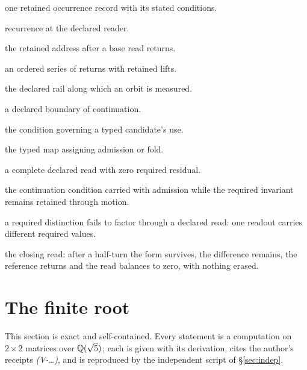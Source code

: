 \documentclass[11pt,a4paper]{article}
\theoremstyle{plain}
\theoremstyle{definition}
\theoremstyle{remark}
\begin{document}
\begin{description}[leftmargin=0pt,labelindent=0pt,itemsep=1pt,font=\normalfont\bfseries]
\item[Receipt] one retained occurrence record with its stated conditions.
\item[Return] recurrence at the declared reader.
\item[Lift] the retained address after a base read returns.
\item[Orbit] an ordered series of returns with retained lifts.
\item[Worldline] the declared rail along which an orbit is measured.
\item[Horizon] a declared boundary of continuation.
\item[Constraint] the condition governing a typed candidate's use.
\item[Gate] the typed map assigning admission or fold.
\item[Silence] a complete declared read with zero required residual.
\item[Survival] the continuation condition carried with admission while the required invariant remains retained through motion.
\item[Forget] a required distinction fails to factor through a declared read: one readout carries different required values.
\item[Endurance] the closing read: after a half-turn the form survives, the difference remains, the reference returns and the read balances to zero, with nothing erased.
\end{description}
\section{The finite root}\label{sec:root}
This section is exact and self-contained. Every statement is a computation on $2\times2$ matrices over $\mathbb{Q}(\sqrt5)$; each is given with its derivation, cites the author's receipts \textit{(V-\dots)}, and is reproduced by the independent script of \S\ref{sec:indep}.
\end{document}

